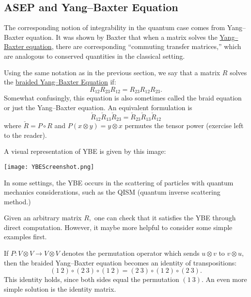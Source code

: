 \documentclass{ximera}
\begin{document}
\subsection{ASEP and Yang--Baxter Equation}
The corresponding notion of integrability in the quantum case comes from Yang--Baxter equation. 
It was shown by Baxter \cite{Bax72} that when a matrix solves the \href{https://en.wikipedia.org/wiki/Yang%E2%80%93Baxter_equation}{Yang--Baxter equation}, there are corresponding
``commuting transfer matrices,'' which are analogous to conserved quantities in the classical setting. 



Using the same notation as in the previous section, 
we say that a matrix \(R\) solves the \underline{braided Yang--Baxter Equation} if:
\[
R_{12}R_{23}R_{12} = R_{23}R_{12}R_{23}.
\]
Somewhat confusingly, this equation is also sometimes called the braid equation or just the Yang--Baxter equation.
An equivalent formulation is
\[
\check{R}_{12}\check{R}_{13}\check{R}_{23} = \check{R}_{23}\check{R}_{13}\check{R}_{12}
\]
where $\check{R} = P \circ R$ and $P(x \otimes y) = y \otimes x$ permutes the tensor power
(exercise left to the reader). 

A visual representation of YBE is given by this image:

\texttt{[image: YBEScreenshot.png]}

In some settings, the YBE occurs in the scattering of particles with quantum mechanics considerations, 
such as the QISM (quantum inverse scattering method.)

Given an arbitrary matrix \(R,\) one can check that it satisfies the YBE
through direct computation. However, it maybe more helpful to consider some simple examples first. 

If \(P: V \otimes V \rightarrow V \otimes V\) denotes the permutation operator which sends
\(u \otimes v\) to \(v \otimes u,\) then the braided Yang--Baxter equation becomes an identity of transpositions:
\[
(1\ 2) \circ (2 \ 3 ) \circ (1 \ 2 ) = (2 \ 3) \circ (1 \ 2) \circ (2 \ 3).
\]
This identity holds, since both sides equal the permutation \((1\ 3).\) An even more simple solution is 
the identity matrix. 
\end{document}
